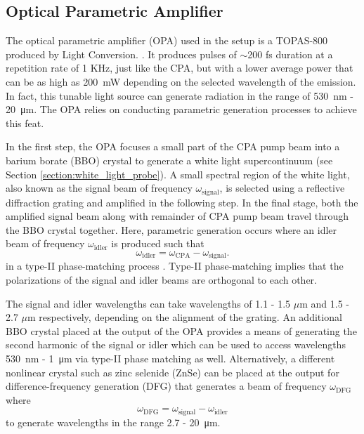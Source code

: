 \subsection{Optical Parametric Amplifier}
\label{section:opa}

The optical parametric amplifier (OPA) used in the setup is a TOPAS-800 produced by Light Conversion. \cite{topas}. It produces pulses of $\sim$200 fs duration at a repetition rate of 1 KHz, just like the CPA, but with a lower average power that can be as high as \SI{200}{\milli\watt} depending on the selected wavelength of the emission. In fact, this tunable light source can generate radiation in the range of \SI{530}{\nano\meter} - \SI{20}{\micro\meter}. The OPA relies on conducting parametric generation processes to achieve this feat.

In the first step, the OPA focuses a small part of the CPA pump beam into a barium borate (BBO) crystal to generate a white light supercontinuum (see Section \ref{section:white_light_probe}). A small spectral region of the white light, also known as the signal beam of frequency $\omega_\text{signal}$, is selected using a reflective diffraction grating and amplified in the following step. In the final stage, both the amplified signal beam along with remainder of CPA pump beam travel through the BBO crystal together. Here, parametric generation occurs where an idler beam of frequency $\omega_\text{idler}$ is produced such that
\begin{equation}
	\omega_\text{idler} = \omega_\text{CPA} - \omega_\text{signal}.
\end{equation}
in a type-II phase-matching process \cite{dunn1999parametric}. Type-II phase-matching implies that the polarizations of the signal and idler beams are orthogonal to each other.

The signal and idler wavelengths can take wavelengths of 1.1 - 1.5 $\mu$m  and 1.5 - 2.7 $\mu$m respectively, depending on the alignment of the grating. An additional BBO crystal placed at the output of the OPA provides a means of generating the second harmonic of the signal or idler which can be used to access wavelengths \SI{530}{nm} - \SI{1}{\micro \meter} via type-II phase matching as well. Alternatively, a different nonlinear crystal such as zinc selenide (ZnSe) can be placed at the output for difference-frequency generation (DFG) that generates a beam of frequency $\omega_\text{DFG}$ where
\begin{equation}
	\omega_\text{DFG} = \omega_\text{signal} - \omega_\text{idler}
\end{equation}
to generate wavelengths in the range 2.7 - \SI{20}{\micro\meter}.
